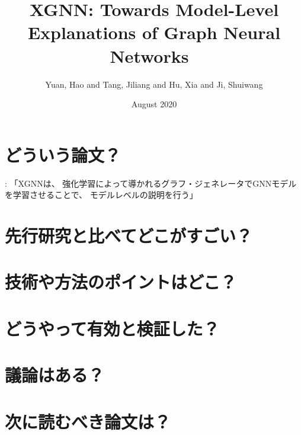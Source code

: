 \documentclass[a4paper,10pt]{ltjsarticle}
\title{XGNN: Towards Model-Level Explanations of Graph Neural Networks\ \cite{yuan2020xgnn}}
\author{Yuan, Hao and Tang, Jiliang and Hu, Xia and Ji, Shuiwang}
\date{August 2020}
\newcommand{\1}{\mbox{1}\hspace{-0.25em}\mbox{l}}
\theoremstyle{definition}
\begin{document}
    \maketitle
    \abstract{}


    \section{どういう論文？}
    \cite{li2022explainability}: 「XGNNは、
    強化学習によって導かれるグラフ・ジェネレータでGNNモデルを学習させることで、
    モデルレベルの説明を行う」


    \section{先行研究と比べてどこがすごい？}


    \section{技術や方法のポイントはどこ？}


    \section{どうやって有効と検証した？}


    \section{議論はある？}


    \section{次に読むべき論文は？}


    
    
\end{document}
